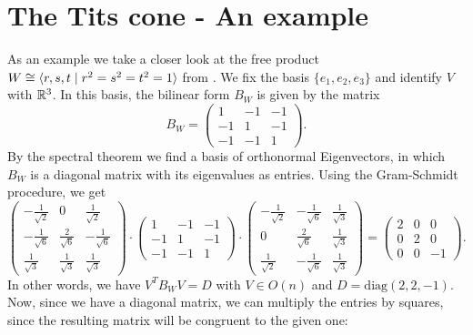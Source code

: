 \section{The Tits cone - An example} %

As an example we take a closer look at the free product \(W \cong\langle r,s,t\;\vert\;r^2=s^2=t^2=1\rangle\) from .
We fix the basis \(\{e_1,e_2,e_3\}\) and identify \(V\) with \(\mathbb{R}^3\).
In this basis, the bilinear form \(B_W\) is given by the matrix
\begin{equation*}
    B_W =
    \begin{pmatrix}
        1  & -1 & -1 \\
        -1 & 1  & -1 \\
        -1 & -1 & 1
    \end{pmatrix}.
\end{equation*}
By the spectral theorem we find a basis of orthonormal Eigenvectors, in which \(B_W\) is a diagonal matrix with its eigenvalues as entries.
Using the Gram-Schmidt procedure, we get
\begin{equation*}
    \begin{pmatrix}
        -\frac{1}{\sqrt{2}} & 0                  & \frac{1}{\sqrt{2}}  \\
        -\frac{1}{\sqrt{6}} & \frac{2}{\sqrt{6}} & -\frac{1}{\sqrt{6}} \\
        \frac{1}{\sqrt{3}}  & \frac{1}{\sqrt{3}} & \frac{1}{\sqrt{3}}
    \end{pmatrix} \cdot
    \begin{pmatrix}
        1  & -1 & -1 \\
        -1 & 1  & -1 \\
        -1 & -1 & 1
    \end{pmatrix} \cdot
    \begin{pmatrix}
        -\frac{1}{\sqrt{2}} & -\frac{1}{\sqrt{6}} & \frac{1}{\sqrt{3}} \\
        0                   & \frac{2}{\sqrt{6}}  & \frac{1}{\sqrt{3}} \\
        \frac{1}{\sqrt{2}}  & -\frac{1}{\sqrt{6}} & \frac{1}{\sqrt{3}}
    \end{pmatrix} =
    \begin{pmatrix}
        2 & 0 & 0  \\
        0 & 2 & 0  \\
        0 & 0 & -1
    \end{pmatrix}.
\end{equation*}
In other words, we have \(V^T B_W V = D\) with \(V\in O(n)\) and \(D = \text{diag}(2,2,-1)\).
Now, since we have a diagonal matrix, we can multiply the entries by squares, since the resulting matrix will be congruent to the given one:

